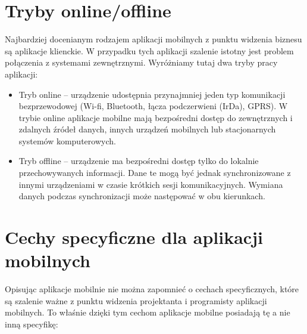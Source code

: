 \section{Tryby online/offline}
\label{sec:trybyAplikacjiMobilnych}

Najbardziej docenianym rodzajem aplikacji mobilnych z punktu widzenia biznesu są aplikacje klienckie. W przypadku tych aplikacji szalenie istotny jest problem połączenia z systemami zewnętrznymi. Wyróżniamy tutaj dwa tryby pracy aplikacji:

\begin{itemize}
\item Tryb online -- urządzenie udostępnia przynajmniej jeden typ komunikacji bezprzewodowej (Wi-fi, Bluetooth, łącza podczerwieni (IrDa), GPRS). W trybie online aplikacje mobilne mają bezpośredni dostęp do zewnętrznych i zdalnych źródeł danych, innych urządzeń mobilnych lub stacjonarnych systemów komputerowych.   
\item Tryb offline -- urządzenie ma bezpośredni dostęp tylko do lokalnie przechowywanych informacji. Dane te mogą być jednak synchronizowane z innymi urządzeniami w czasie krótkich sesji komunikacyjnych. Wymiana danych podczas synchronizacji może następować w obu kierunkach. 
\end{itemize}

\section{Cechy specyficzne dla aplikacji mobilnych }
\label{sec:cechyAplikacjiMobilnych}

Opisując aplikacje mobilnie nie można zapomnieć o cechach specyficznych, które są szalenie ważne z punktu widzenia projektanta i programisty aplikacji mobilnych. To właśnie dzięki tym cechom aplikacje mobilne posiadają tę a nie inną specyfikę:


